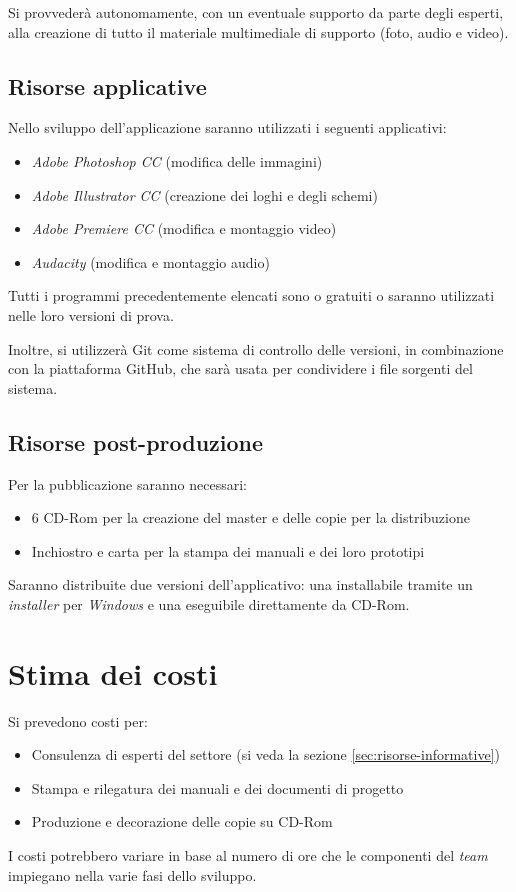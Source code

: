 Si provvederà autonomamente, con un eventuale supporto da parte degli esperti, alla creazione di tutto il materiale multimediale di supporto (foto, audio e video).

\subsection{Risorse applicative}
Nello sviluppo dell'applicazione saranno utilizzati i seguenti applicativi:
\begin{itemize}
	\item \emph{Adobe Photoshop CC} (modifica delle immagini)
	\item \emph{Adobe Illustrator CC} (creazione dei loghi e degli schemi)
	\item \emph{Adobe Premiere CC} (modifica e montaggio video)
	\item \emph{Audacity} (modifica e montaggio audio)
\end{itemize}
Tutti i programmi precedentemente elencati sono o gratuiti o saranno utilizzati nelle loro versioni di prova.

Inoltre, si utilizzerà Git come sistema di controllo delle versioni, in combinazione con la piattaforma GitHub, che sarà usata per condividere i file sorgenti del sistema.

\subsection{Risorse post-produzione}
Per la pubblicazione saranno necessari:
\begin{itemize}
	\item 6 CD-Rom per la creazione del master e delle copie per la distribuzione
	\item Inchiostro e carta per la stampa dei manuali e dei loro prototipi
\end{itemize}
Saranno distribuite due versioni dell'applicativo: una installabile tramite un \textit{installer} per \textit{Windows} e una eseguibile direttamente da CD-Rom.

\section{Stima dei costi}
Si prevedono costi per:
\begin{itemize}
	\item Consulenza di esperti del settore (si veda la sezione \ref{sec:risorse-informative})
	\item Stampa e rilegatura dei manuali e dei documenti di progetto
	\item Produzione e decorazione delle copie su CD-Rom
\end{itemize}

I costi potrebbero variare in base al numero di ore che le componenti del \textit{team} impiegano nella varie fasi dello sviluppo.